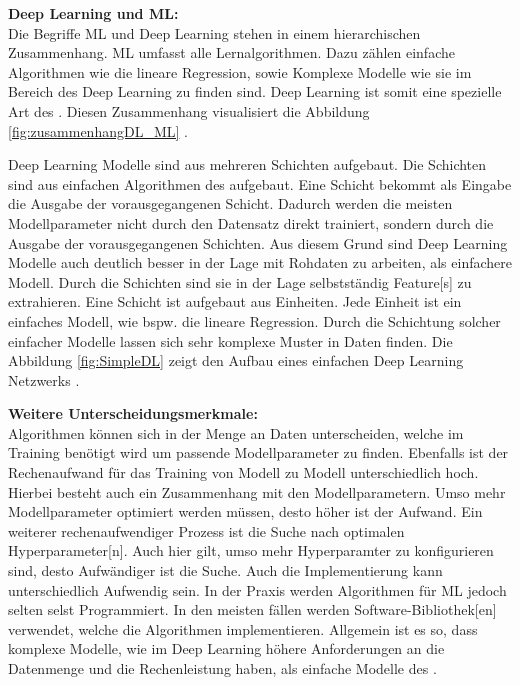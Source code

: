 \textbf{\gls{Deep Learning} und \gls{ML}:}\\
Die Begriffe \gls{ML} und \gls{Deep Learning} stehen in einem hierarchischen Zusammenhang. \Gls{ML} umfasst alle Lernalgorithmen. Dazu zählen einfache Algorithmen wie die lineare Regression, sowie Komplexe Modelle wie sie im Bereich des \gls{Deep Learning} zu finden sind. \gls{Deep Learning} ist somit eine spezielle Art des . Diesen Zusammenhang visualisiert die Abbildung \ref{fig:zusammenhangDL_ML} \cite{Goodfellow.2016, Burkov.2019}.


\gls{Deep Learning} Modelle sind aus mehreren Schichten aufgebaut. Die Schichten sind aus einfachen Algorithmen des  aufgebaut. Eine Schicht bekommt als Eingabe die Ausgabe der vorausgegangenen Schicht. Dadurch werden die meisten Modellparameter nicht durch den Datensatz direkt trainiert, sondern durch die Ausgabe der vorausgegangenen Schichten. Aus diesem Grund sind \gls{Deep Learning} Modelle auch deutlich besser in der Lage mit Rohdaten zu arbeiten, als einfachere Modell. Durch die Schichten sind sie in der Lage selbstständig \gls{Feature}[s] zu extrahieren. Eine Schicht ist aufgebaut aus Einheiten. Jede Einheit ist ein einfaches Modell, wie bspw. die lineare Regression. Durch die Schichtung solcher einfacher Modelle lassen sich sehr komplexe Muster in Daten finden. Die Abbildung \ref{fig:SimpleDL} zeigt den Aufbau eines einfachen \gls{Deep Learning} Netzwerks \cite{Burkov.2019, Goodfellow.2016}. 


\textbf{Weitere Unterscheidungsmerkmale:}\\
Algorithmen können sich in der Menge an Daten unterscheiden, welche im Training benötigt wird um passende Modellparameter zu finden. Ebenfalls ist der Rechenaufwand für das Training von Modell zu Modell unterschiedlich hoch. Hierbei besteht auch ein Zusammenhang mit den Modellparametern. Umso mehr Modellparameter optimiert werden müssen, desto höher ist der Aufwand. Ein weiterer rechenaufwendiger Prozess ist die Suche nach optimalen \gls{Hyperparameter}[n]. Auch hier gilt, umso mehr Hyperparamter zu konfigurieren sind, desto Aufwändiger ist die Suche. Auch die Implementierung kann unterschiedlich Aufwendig sein. In der Praxis werden Algorithmen für \gls{ML} jedoch selten selst Programmiert. In den meisten fällen werden Software-\gls{Bibliothek}[en] verwendet, welche die Algorithmen implementieren. Allgemein ist es so, dass komplexe Modelle, wie im \gls{Deep Learning} höhere Anforderungen an die Datenmenge und die Rechenleistung haben, als einfache Modelle des  \cite{Burkov.2019, ShalevShwartz.2014}.


